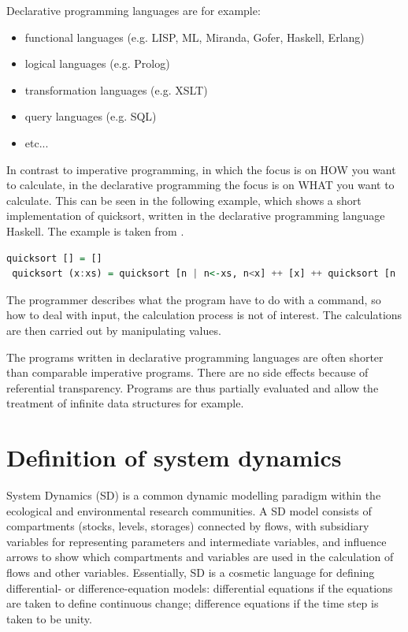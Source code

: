 \par
Declarative programming languages are for example:
\begin{itemize}
	\item functional languages (e.g. LISP, ML, Miranda, Gofer, Haskell, Erlang)
	\item logical languages (e.g. Prolog)
	\item transformation languages (e.g. XSLT)
	\item query languages (e.g. SQL)
	\item etc...
\end{itemize}

\par
In contrast to imperative programming, in which the focus is on HOW you want to calculate, in the declarative programming the focus is on WHAT you want to calculate. This can be seen in the following example, which shows a short implementation of quicksort, written in the declarative programming language Haskell. The example is taken from \autocite{appendix:declarative_programming}.
\begin{lstlisting}[language=Haskell]
 quicksort [] = []
 quicksort (x:xs) = quicksort [n | n<-xs, n<x] ++ [x] ++ quicksort [n | n<-xs, n>=x]
\end{lstlisting}
The programmer describes what the program have to do with a command, so how to deal with input, the calculation process is not of interest. The calculations are then carried out by manipulating values.
\par
The programs written in declarative programming languages are often shorter than comparable imperative programs. There are no side effects because of referential transparency. Programs are thus partially evaluated and allow the treatment of infinite data structures for example. \autocite{appendix:hawkins}

\section{Definition of system dynamics}
\par
System Dynamics (SD) is a common dynamic modelling paradigm within the ecological and environmental research communities. A SD model consists of compartments (stocks, levels, storages) connected by flows, with subsidiary variables for representing parameters and intermediate variables, and influence arrows to show which compartments and variables are used in the calculation of flows and other variables. Essentially, SD is a cosmetic language for defining differential- or difference-equation models: differential equations if the equations are taken to define continuous change; difference equations if the time step is taken to be unity. \autocite{appendix:model_paradigm}

